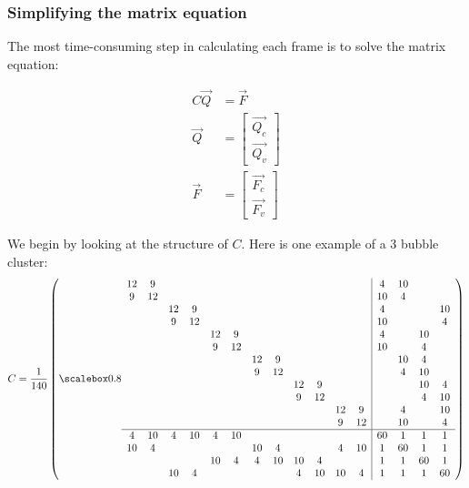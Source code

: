 \documentclass{article}
\begin{document}
\subsubsection{Simplifying the matrix equation}

The most time-consuming step in calculating each frame is to solve the matrix equation:

\begin{align*}
C \vec{Q} &= \vec{F}\\
\vec{Q} &=
\begin{bmatrix} 
\vec{Q_c} \\ 
\vec{Q_v}
\end{bmatrix}\\
\vec{F} &=
\begin{bmatrix} 
\vec{F_c} \\ 
\vec{F_v}
\end{bmatrix}
\end{align*}

We begin by looking at the structure of $C$. Here is one example of a 3 bubble cluster:
\begin{align*}
C = \frac{1}{140} \left(
    \scalemath{0.8}{
 \begin{array}{cccccccccccc|cccc}
12& 9& & & & & & & & & & & 4&10& & \\
 9&12& & & & & & & & & & &10& 4& & \\
 & &12& 9& & & & & & & & & 4& & &10\\
 & & 9&12& & & & & & & & &10& & & 4\\
 & & & &12& 9& & & & & & & 4& &10& \\
 & & & & 9&12& & & & & & &10& & 4& \\
 & & & & & &12& 9& & & & & &10& 4& \\
 & & & & & & 9&12& & & & & & 4&10& \\
 & & & & & & & &12& 9& & & & &10& 4\\
 & & & & & & & & 9&12& & & & & 4&10\\
 & & & & & & & & & &12& 9& & 4& &10\\
 & & & & & & & & & & 9&12& &10& & 4\\ \hline
4&10& 4&10& 4&10& & & & & & &60& 1& 1& 1\\
10& 4& & & & &10& 4& & & 4&10& 1&60& 1& 1\\
 & & & &10& 4& 4&10&10& 4& & & 1& 1&60& 1\\
 & &10& 4& & & & & 4&10&10& 4& 1& 1& 1&60\\
\end{array}
}
\right)
\end{align*}
\end{document}
